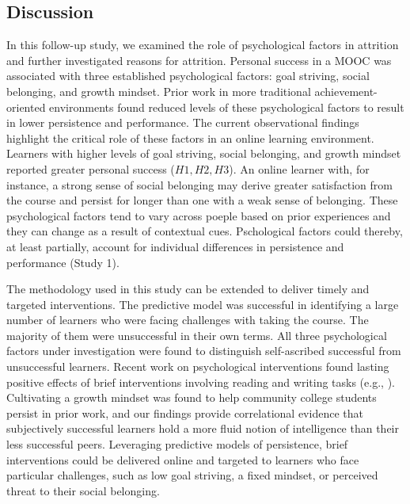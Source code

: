 \documentclass{sigchi}\usepackage[]{graphicx}\usepackage[]{color}
\begin{document}
\subsection{Discussion}

In this follow-up study, we examined the role of psychological factors in attrition and further investigated reasons for attrition. Personal success in a MOOC was associated with three established psychological factors: goal striving, social belonging, and growth mindset. Prior work in more traditional achievement-oriented environments found reduced levels of these psychological factors to result in lower persistence and performance. The current observational findings highlight the critical role of these factors in an online learning environment. Learners with higher levels of goal striving, social belonging, and growth mindset reported greater personal success ($H1,H2,H3$). An online learner with, for instance, a strong sense of social belonging may derive greater satisfaction from the course and persist for longer than one with a weak sense of belonging. These psychological factors tend to vary across poeple based on prior experiences and they can change as a result of contextual cues. Pschological factors could thereby, at least partially, account for individual differences in persistence and performance (Study 1).

The methodology used in this study can be extended to deliver timely and targeted interventions. The predictive model was successful in identifying a large number of learners who were facing challenges with taking the course. The majority of them were unsuccessful in their own terms. All three psychological factors under investigation were found to distinguish self-ascribed successful from unsuccessful learners. Recent work on psychological interventions found lasting positive effects of brief interventions involving reading and writing tasks (e.g., \cite{walton2007question}). Cultivating a growth mindset was found to help community college students persist in prior work, and our findings provide correlational evidence that subjectively successful learners hold a more fluid notion of intelligence than their less successful peers. Leveraging predictive models of persistence, brief interventions could be delivered online and targeted to learners who face particular challenges, such as low goal striving, a fixed mindset, or perceived threat to their social belonging. 
\end{document}
